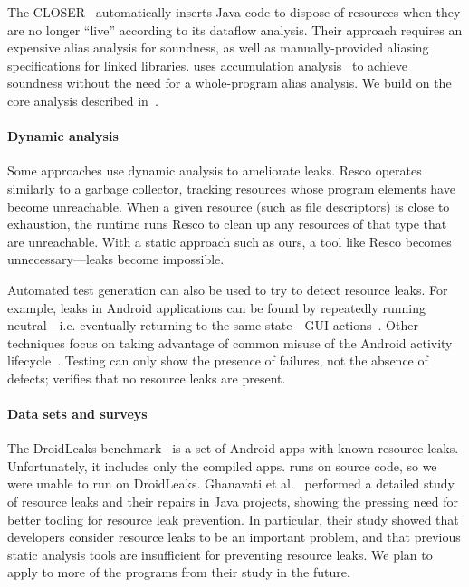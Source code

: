 The CLOSER~\cite{dillig2008closer} automatically inserts Java code to
dispose of resources when they are no longer ``live'' according to its
dataflow analysis.  Their approach requires an expensive alias
analysis for soundness, as well as manually-provided aliasing
specifications for linked libraries. \Tool uses
accumulation analysis~\cite{KelloggRSSE2020,FahndrichLeino03} to
achieve soundness without the need for a whole-program alias analysis.
We build on the core analysis described in~\cite{KelloggRSSE2020}.

\paragraph{Dynamic analysis}
Some approaches use dynamic analysis to ameliorate leaks.  Resco \cite{dai2013resco}
operates similarly to a garbage collector, tracking resources whose program
elements have become unreachable. When a given resource (such as file
descriptors) is close to exhaustion, the runtime runs Resco to clean up any
resources of that type that are unreachable.  With a static approach such as
ours, a tool like Resco becomes unnecessary---leaks become impossible.

Automated test generation can also be used to try to detect resource
leaks. For example, leaks in Android applications can be found by
repeatedly running neutral---i.e. eventually returning to the same
state---GUI actions~\cite{wu2018sentinel,zhang2016automated}.
Other techniques focus on taking advantage of common misuse of
the Android activity lifecycle~\cite{amalfitano2020memories}.
Testing can only show the presence of failures, not the absence of defects;
\tool verifies that no resource leaks are present.

\paragraph{Data sets and surveys}
The DroidLeaks
benchmark~\cite{liu2019droidleaks} is a set of Android apps with known resource
leaks. Unfortunately, it includes only the compiled apps. \Tool runs on
source code, so we were unable to run \tool on DroidLeaks. Ghanavati et
al.~\cite{ghanavati2020memory} performed a detailed study of resource
leaks and their repairs in Java projects, showing the pressing need for better
tooling for resource leak prevention.  In particular, their study showed that
developers consider resource leaks to be an important problem, and that previous
static analysis tools are insufficient for preventing resource leaks.  We plan
to apply \tool to more of the programs from their study in the future.

